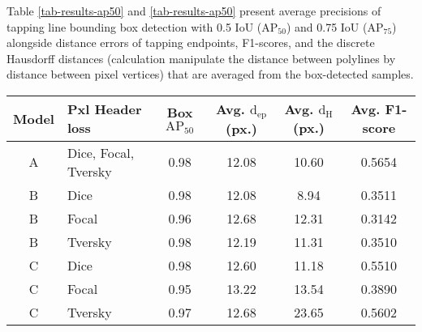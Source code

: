 \documentclass[default,pdflatex,iicol]{sn-jnl}%
\begin{document}
Table \ref{tab-results-ap50} and \ref{tab-results-ap50} present average precisions of tapping line bounding box detection with 0.5 IoU ($\mathrm{AP}_{50}$) and 0.75 IoU ($\mathrm{AP}_{75}$) alongside distance errors of tapping endpoints, F1-scores, and the discrete Hausdorff distances (calculation manipulate the distance between polylines by distance between pixel vertices) that are averaged from the box-detected samples.

\begin{table*}[]
\centering
\caption{Detection results on the proposed model and baseline models at various settings. All metrics are averaged on the box-detected samples at 0.5 IoU}
\label{tab-results-ap50}
\begin{minipage}{\linewidth}
\begin{center}
\begin{tabular}{clcccc}
Model & Pxl Header loss & Box $\mathrm{AP_{50}}$ & Avg. $\mathrm{d_{ep}}$(px.)	& Avg. $\mathrm{d_{H}}$(px.)	& Avg. F1-score	\\ \midrule
A 	& Dice, Focal, Tversky 	& 0.98	&	12.08		& 	10.60	&	 0.5654 \\ \midrule
B	& Dice		& 0.98	&	12.08	&	8.94	& 0.3511	\\
B	& Focal		& 0.96	&	12.68	&	12.31	&	0.3142	\\ 
B	& Tversky	& 0.98 	&	12.19	&  11.31	&	0.3510   \\ \midrule
C 	& Dice		& 0.98	&	12.60	&	11.18	&	0.5510	\\
C 	& Focal		& 0.95	&	13.22	&	13.54	&	0.3890	\\
C 	& Tversky	& 0.97	&	12.68	&	23.65	&	0.5602	\\ 
\bottomrule
\end{tabular}%
\end{center}
\end{minipage}
\end{table*}
\end{document}
